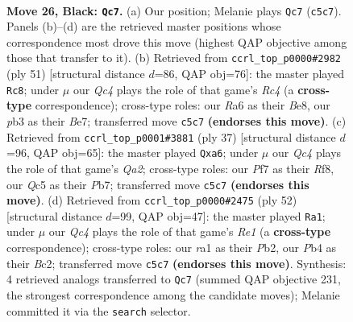 \documentclass[11pt]{article}
\begin{document}
\clearpage

\begin{figure}[p]\centering
\begin{subfigure}{0.46\textwidth}\centering
\resizebox{\linewidth}{!}{%
\newchessgame
\chessboard[
  setfen={2b5/5pkp/rp3np1/2q5/PpN5/1P4PN/4RPBP/R5K1 b - - 3 26},
  showmover=false,
  pgfstyle=straightmove, color=movearrow, markmove={c5-c7}
]}
\caption{}
\end{subfigure}\hfill
\begin{subfigure}{0.46\textwidth}\centering
\resizebox{\linewidth}{!}{%
\newchessgame
\chessboard[
  setfen={4b1k1/4bpp1/4p2p/2r5/p7/PqN1P1P1/1P3PBP/1QR3K1 b - - 8 26},
  showmover=false,
  pgfstyle=straightmove, color=movearrow, markmove={c5-c8}
]}
\caption{}
\end{subfigure}
\\[4pt]
\begin{subfigure}{0.46\textwidth}\centering
\resizebox{\linewidth}{!}{%
\newchessgame
\chessboard[
  setfen={5rk1/qp2pp1p/N1n3p1/8/P3b3/P4NP1/4PPBP/2Q2RK1 b - - 0 19},
  showmover=false,
  pgfstyle=straightmove, color=movearrow, markmove={a7-a6}
]}
\caption{}
\end{subfigure}\hfill
\begin{subfigure}{0.46\textwidth}\centering
\resizebox{\linewidth}{!}{%
\newchessgame
\chessboard[
  setfen={5r1k/2q2ppp/3ppn2/1p6/3Pb2P/2PN2Q1/1PB2PP1/4R1K1 w - - 2 27},
  showmover=false,
  pgfstyle=straightmove, color=movearrow, markmove={e1-a1}
]}
\caption{}
\end{subfigure}
\caption{\textbf{Move 26, Black: \texttt{Qc7}.} (a) Our position; Melanie plays \texttt{Qc7} (\texttt{c5c7}). Panels (b)--(d) are the retrieved master positions whose correspondence most drove this move (highest QAP objective among those that transfer to it). (b) Retrieved from \texttt{ccrl\_top\_p0000\#2982} (ply 51) [structural distance $d$=86, QAP obj=76]: the master played \texttt{Rc8}; under $\mu$ our \emph{Qc4} plays the role of that game's \emph{Rc4} (a \textbf{cross-type} correspondence); cross-type roles: our \emph{R}a6 as their \emph{B}e8, our \emph{p}b3 as their \emph{B}e7; transferred move \texttt{c5c7} \textbf{(endorses this move)}. (c) Retrieved from \texttt{ccrl\_top\_p0001\#3881} (ply 37) [structural distance $d$=96, QAP obj=65]: the master played \texttt{Qxa6}; under $\mu$ our \emph{Qc4} plays the role of that game's \emph{Qa2}; cross-type roles: our \emph{P}f7 as their \emph{R}f8, our \emph{Q}c5 as their \emph{P}b7; transferred move \texttt{c5c7} \textbf{(endorses this move)}. (d) Retrieved from \texttt{ccrl\_top\_p0000\#2475} (ply 52) [structural distance $d$=99, QAP obj=47]: the master played \texttt{Ra1}; under $\mu$ our \emph{Qc4} plays the role of that game's \emph{Re1} (a \textbf{cross-type} correspondence); cross-type roles: our \emph{r}a1 as their \emph{P}b2, our \emph{P}b4 as their \emph{B}c2; transferred move \texttt{c5c7} \textbf{(endorses this move)}. Synthesis: 4 retrieved analogs transferred to \texttt{Qc7} (summed QAP objective 231, the strongest correspondence among the candidate moves); Melanie committed it via the \texttt{search} selector.}
\label{fig:thought-m51}
\end{figure}
\end{document}
